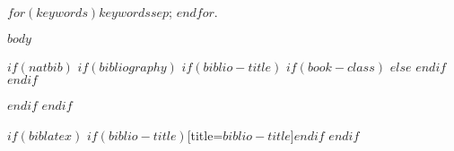 \documentclass[$for(classoption)$$classoption$$sep$,$endfor$]{jds}
\title$if(short-title)$[$short-title$]$endif${$title$}
\author[$author.marker$]{$author.name$}
\affil[$affiliation.marker$]{$affiliation.name$}
\begin{document}
\maketitle

\begin{abstract}
$abstract$
\end{abstract}

\begin{keywords}
$for(keywords)$$keywords$$sep$; $endfor$.
\end{keywords}

$body$

$if(natbib)$
$if(bibliography)$
$if(biblio-title)$
$if(book-class)$
\renewcommand\bibname{$biblio-title$}
$else$
\renewcommand\refname{$biblio-title$}
$endif$
$endif$


$endif$
$endif$

$if(biblatex)$
\printbibliography$if(biblio-title)$[title=$biblio-title$]$endif$
$endif$
\end{document}
